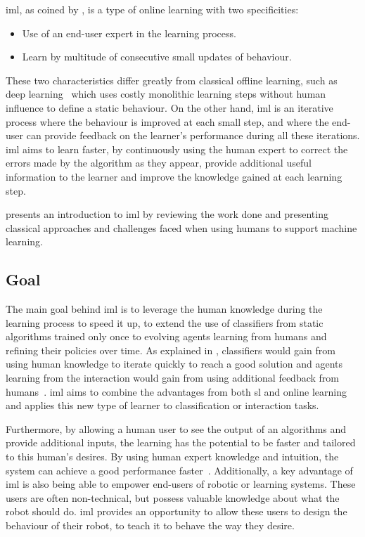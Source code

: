 \acrfull{iml}, as coined by \cite{fails2003interactive}, is a type of online learning with two specificities:
\begin{itemize}
	\item Use of an end-user expert in the learning process.
	\item Learn by multitude of consecutive small updates of behaviour.
\end{itemize}
These two characteristics differ greatly from classical offline learning, such as deep learning~\citep{lecun2015deep} which uses costly monolithic learning steps without human influence to define a static behaviour. On the other hand, \gls{iml} is an iterative process where the behaviour is improved at each small step, and where the end-user can provide feedback on the learner's performance during all these iterations. \gls{iml} aims to learn faster, by continuously using the human expert to correct the errors made by the algorithm as they appear, provide additional useful information to the learner and improve the knowledge gained at each learning step.

\cite{amershi2014power} presents an introduction to \gls{iml} by reviewing the work done and presenting classical approaches and challenges faced when using humans to support machine learning.

\subsection{Goal}

The main goal behind \gls{iml} is to leverage the human knowledge during the learning process to speed it up, to extend the use of classifiers from static algorithms trained only once to evolving agents learning from humans and refining their policies over time. As explained in \cite{fails2003interactive}, classifiers would gain from using human knowledge to iterate quickly to reach a good solution and agents learning from the interaction would gain from using additional feedback from humans~\citep{thomaz2008teachable,knox2009interactively}. \gls{iml} aims to combine the advantages from both \gls{sl} and online learning and applies this new type of learner to classification or interaction tasks.

Furthermore, by allowing a human user to see the output of an algorithms and provide additional inputs, the learning has the potential to be faster and tailored to this human's desires. By using human expert knowledge and intuition, the system can achieve a good performance faster~\citep{thomaz2008teachable}. Additionally, a key advantage of \gls{iml} is also being able to empower end-users of robotic or learning systems. These users are often non-technical, but possess valuable knowledge about what the robot should do. \gls{iml} provides an opportunity to allow these users to design the behaviour of their robot, to teach it to behave the way they desire.

